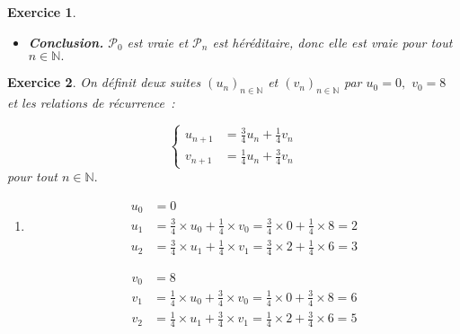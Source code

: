 \documentclass[10pt]{article}
\newtheorem{exo}{Exercice}
\begin{document}
\begin{exo}
\begin{enumerate}
\begin{itemize}
La propriété $\mathcal{P}_{k+1}$ est donc vraie.
\item[{\textbullet}] \textbf{Conclusion.} $\mathcal{P}_0$ est vraie et $\mathcal{P}_n$ est héréditaire, donc elle est vraie pour tout $n\in\mathbb{N}.$
\end{itemize}
\end{enumerate}

\end{exo}



\begin{exo}

On définit deux suites $\left(u_n\right)_{n\in\mathbb{N}}$ et $\left(v_n\right)_{n\in\mathbb{N}}$ par $u_0=0,$ $v_0=8$ et les relations de récurrence~:

\[\begin{cases}
u_{n+1}&=\frac{3}{4}u_n+\frac{1}{4}v_n\\
v_{n+1}&=\frac{1}{4}u_n+\frac{3}{4}v_n\end{cases}\] pour tout $n\in\mathbb{N}.$

\begin{enumerate}
\item \setlength{\columnseprule}{1pt}

\begin{multicols}{2}
\begin{align*}
u_0&=0\\
u_1&=\frac{3}{4}\times u_0+\frac{1}{4}\times v_0=\frac{3}{4}\times 0+\frac{1}{4}\times 8=2\\
u_2&=\frac{3}{4}\times u_1+\frac{1}{4}\times v_1=\frac{3}{4}\times 2+\frac{1}{4}\times 6=3
\end{align*}

\begin{align*}
v_0&=8\\
v_1&=\frac{1}{4}\times u_0+\frac{3}{4}\times v_0=\frac{1}{4}\times 0+\frac{3}{4}\times 8=6\\
v_2&=\frac{1}{4}\times u_1+\frac{3}{4}\times v_1=\frac{1}{4}\times 2+\frac{3}{4}\times 6=5
\end{align*}
\end{multicols}

\medskip



\end{enumerate}
\end{exo}
\end{document}
